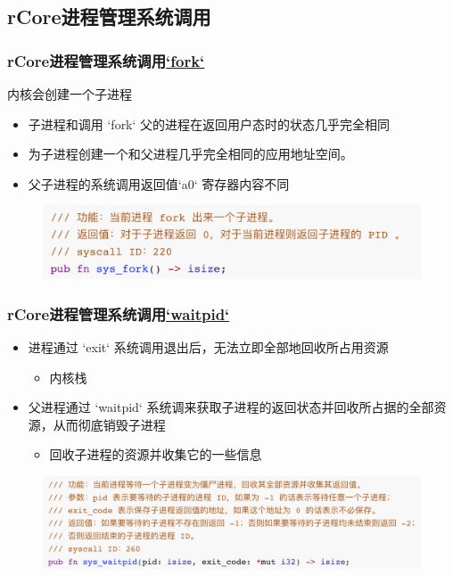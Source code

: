 \subsection{rCore进程管理系统调用}
% 
\begin{frame}[fragile]
    \frametitle{rCore进程管理系统调用\href{https://rcore-os.github.io/rCore-Tutorial-Book-v3/chapter5/1process.html\#fork}{`fork`}}
    内核会创建一个子进程
    \begin{itemize}
        \item 子进程和调用 `fork` 父的进程在返回用户态时的状态几乎完全相同
        \item 为子进程创建一个和父进程几乎完全相同的应用地址空间。
        \item 父子进程的系统调用返回值`a0` 寄存器内容不同
    \end{itemize}
% 
	\begin{figure}
		\centering
		\includegraphics[width=0.9\linewidth]{figs/fork.png}
	\end{figure}



% 
\end{frame}
\begin{frame}[fragile]
    \frametitle{rCore进程管理系统调用\href{https://rcore-os.github.io/rCore-Tutorial-Book-v3/chapter5/1process.html\#waitpid}{`waitpid`}}
    \begin{itemize}
        \item 进程通过 `exit` 系统调用退出后，无法立即全部地回收所占用资源
    \begin{itemize}
        \item 内核栈
    \end{itemize}
        \item 父进程通过 `waitpid` 系统调来获取子进程的返回状态并回收所占据的全部资源，从而彻底销毁子进程
    \begin{itemize}
        \item 回收子进程的资源并收集它的一些信息
    \end{itemize}
    \end{itemize}
% 
	\begin{figure}
		\centering
		\includegraphics[width=0.9\linewidth]{figs/waitpid.png}
	\end{figure}



% 
\end{frame}
